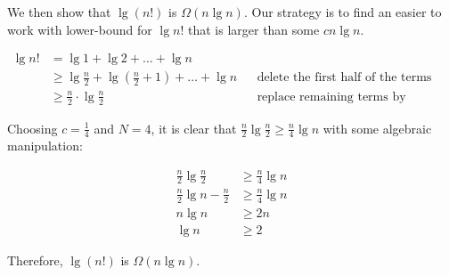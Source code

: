 We then show that $\lg(n!)$ is $\Omega(n\lg n)$. Our strategy is to find an easier to work with lower-bound for $\lg n!$ that is larger than some $c n\lg n$.

\begin{align*}
    \lg n! &= \lg 1 + \lg 2 + \dots + \lg n\\
           &\geq \lg \frac{n}{2} + \lg(\frac{n}{2}+1) + \dots + \lg n&&\text{delete the first half of the terms}\\
           &\geq \frac{n}{2}\cdot\lg\frac{n}{2}&&\text{replace remaining terms by smallest one}
\end{align*}

Choosing $c = \frac{1}{4}$ and $N = 4$, it is clear that $\frac{n}{2}\lg \frac{n}{2} \geq \frac{n}{4} \lg n$ with some algebraic manipulation:

\begin{align*}
    \frac{n}{2}\lg\frac{n}{2}&\geq\frac{n}{4}\lg n\\
    \frac{n}{2}\lg n - \frac{n}{2}&\geq \frac{n}{4}\lg n\\
    n \lg n &\geq 2n\\
    \lg n &\geq 2
\end{align*}

Therefore, $\lg(n!)$ is $\Omega(n \lg n)$.
